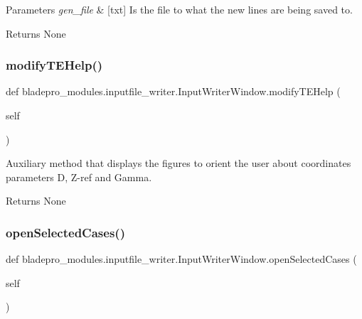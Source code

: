 \begin{DoxyParams}{Parameters}
{\em gen\+\_\+file} & \mbox{[}txt\mbox{]} Is the file to what the new lines are being saved to. \\
\hline
\end{DoxyParams}
\begin{DoxyReturn}{Returns}
None 
\end{DoxyReturn}
\hypertarget{classbladepro__modules_1_1inputfile__writer_1_1_input_writer_window_a0894116159595156b62859c796bdea1d}{}\label{classbladepro__modules_1_1inputfile__writer_1_1_input_writer_window_a0894116159595156b62859c796bdea1d} 
\subsubsection{\texorpdfstring{modify\+T\+E\+Help()}{modifyTEHelp()}}
{\footnotesize\ttfamily def bladepro\+\_\+modules.\+inputfile\+\_\+writer.\+Input\+Writer\+Window.\+modify\+T\+E\+Help (\begin{DoxyParamCaption}\item[{}]{self }\end{DoxyParamCaption})}



Auxiliary method that displays the figures to orient the user about coordinates parameters D, Z-\/ref and Gamma. 

\begin{DoxyReturn}{Returns}
None 
\end{DoxyReturn}
\hypertarget{classbladepro__modules_1_1inputfile__writer_1_1_input_writer_window_af311095fe10adcca5237385033dfe67b}{}\label{classbladepro__modules_1_1inputfile__writer_1_1_input_writer_window_af311095fe10adcca5237385033dfe67b} 
\subsubsection{\texorpdfstring{open\+Selected\+Cases()}{openSelectedCases()}}
{\footnotesize\ttfamily def bladepro\+\_\+modules.\+inputfile\+\_\+writer.\+Input\+Writer\+Window.\+open\+Selected\+Cases (\begin{DoxyParamCaption}\item[{}]{self }\end{DoxyParamCaption})}



